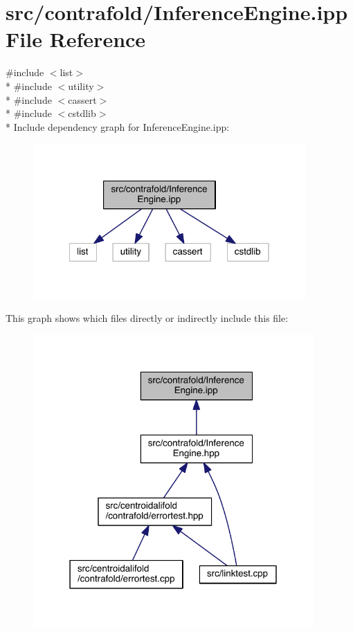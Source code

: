 \hypertarget{contrafold_2_inference_engine_8ipp}{\section{src/contrafold/\+Inference\+Engine.ipp File Reference}
\label{contrafold_2_inference_engine_8ipp}
}
{\ttfamily \#include $<$list$>$}\\*
{\ttfamily \#include $<$utility$>$}\\*
{\ttfamily \#include $<$cassert$>$}\\*
{\ttfamily \#include $<$cstdlib$>$}\\*
Include dependency graph for Inference\+Engine.\+ipp\+:
\nopagebreak
\begin{figure}[H]
\begin{center}
\leavevmode
\includegraphics[width=295pt]{contrafold_2_inference_engine_8ipp__incl}
\end{center}
\end{figure}
This graph shows which files directly or indirectly include this file\+:
\nopagebreak
\begin{figure}[H]
\begin{center}
\leavevmode
\includegraphics[width=303pt]{contrafold_2_inference_engine_8ipp__dep__incl}
\end{center}
\end{figure}
